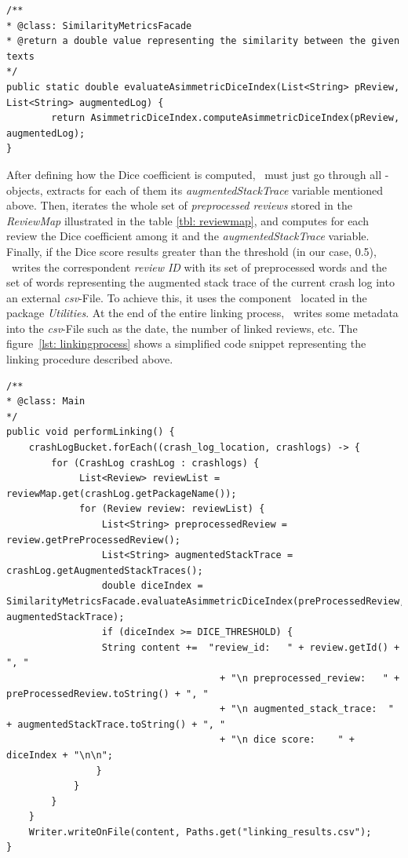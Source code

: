 \begin{lstlisting}[caption=\Facade implementing the design pattern \textit{Facade},label={lst: facade}]
/**
* @class: SimilarityMetricsFacade
* @return a double value representing the similarity between the given texts
*/
public static double evaluateAsimmetricDiceIndex(List<String> pReview, List<String> augmentedLog) {
        return AsimmetricDiceIndex.computeAsimmetricDiceIndex(pReview, augmentedLog);
}
\end{lstlisting}
After defining how the Dice coefficient is computed, \toolname\ must just go through all \Crash-objects, extracts for each of them its \textit{augmentedStackTrace} variable mentioned above. Then, iterates the whole set of \textit{preprocessed reviews} stored in the \textit{ReviewMap} illustrated in the table \ref{tbl: reviewmap}, and computes for each review the Dice coefficient among it and the \textit{augmentedStackTrace} variable. 
Finally, if the Dice score results greater than the threshold (in our case, 0.5), \toolname\ writes the correspondent \textit{review ID} with its set of preprocessed words and the set of words representing the augmented stack trace of the current crash log into an external \textit{csv}-File. To achieve this, it uses the component \Writer\, located in the package \textit{Utilities}. 
At the end of the entire linking process, \toolname\ writes some metadata into the \textit{csv}-File such as the date, the number of linked reviews, etc. 
The figure~\ref{lst: linkingprocess} shows a simplified code snippet representing the linking procedure described above. 
\begin{lstlisting}[caption=Linking process,label={lst: linkingprocess}]
/**
* @class: Main
*/
public void performLinking() {
	crashLogBucket.forEach((crash_log_location, crashlogs) -> {
		for (CrashLog crashLog : crashlogs) {
			 List<Review> reviewList = reviewMap.get(crashLog.getPackageName());
			 for (Review review: reviewList) {
			 	 List<String> preprocessedReview = review.getPreProcessedReview();	
			 	 List<String> augmentedStackTrace = crashLog.getAugmentedStackTraces();
			 	 double diceIndex = SimilarityMetricsFacade.evaluateAsimmetricDiceIndex(preProcessedReview, augmentedStackTrace);
			 	 if (diceIndex >= DICE_THRESHOLD) {	 
			 	 String content +=	"review_id:   " + review.getId() + ", "
	                                  + "\n preprocessed_review:   " + preProcessedReview.toString() + ", "
	                                  + "\n augmented_stack_trace:  " + augmentedStackTrace.toString() + ", "
	                                  + "\n dice score:    " + diceIndex + "\n\n";                     
			 	}
			}
		}
	}
	Writer.writeOnFile(content, Paths.get("linking_results.csv");
}
\end{lstlisting}
